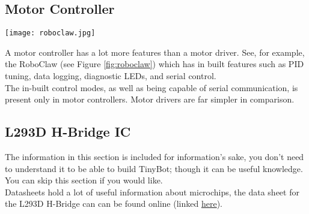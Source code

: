\documentclass[../TinyBot.tex]{subfiles}
\begin{document}
\subsection{Motor Controller}

\begin{minipage}{0.3\textwidth}\vspace{0pt}
    \texttt{[image: roboclaw.jpg]}
    \label{fig:roboclaw}
\end{minipage}
\begin{minipage}{0.7\textwidth}\vspace{0pt}
    A motor controller has a lot more features than a motor driver. See, for example, the RoboClaw  (see Figure \ref{fig:roboclaw}) which has in built features such as PID tuning, data logging, diagnostic LEDs, and serial control. \\
    
    
    The in-built control modes, as well as being capable of serial communication, is present only in motor controllers. Motor drivers are far simpler in comparison. \\

\end{minipage}

\pagebreak
\subsection{L293D H-Bridge IC}

The information in this section is included for information's sake, you don't need to understand it to be able to build TinyBot; though it can be useful knowledge. You can skip this section if you would like. \\



Datasheets hold a lot of useful information about microchips, the data sheet for the L293D H-Bridge can can be found online (linked \href{https://www.altronics.com.au/p/z2900-l293d-motor-drive-ic/}{here}).\\

    
        
\end{document}
